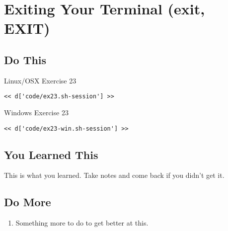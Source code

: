 \chapter{Exiting Your Terminal (exit, EXIT)}

\section{Do This}

\begin{code}{Linux/OSX Exercise 23}
\begin{Verbatim}
<< d['code/ex23.sh-session'] >>
\end{Verbatim}
\end{code}

\begin{code}{Windows Exercise 23}
\begin{Verbatim}
<< d['code/ex23-win.sh-session'] >>
\end{Verbatim}
\end{code}

\section{You Learned This}

This is what you learned.  Take notes and come back if you didn't get it.

\section{Do More}

\begin{enumerate}
\item Something more to do to get better at this.
\end{enumerate}

